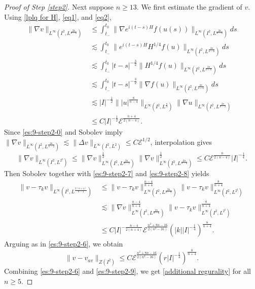 \documentclass[11pt,a4paper]{article}
\numberwithin{equation}{section}
\begin{document}
\begin{proof}[Proof of Step \ref{step2}]
Next suppose $n \geq 13$. We first estimate the gradient of $v$.
Using \eqref{lplq for H}, \eqref{eq1}, and \eqref{eq2},
\begin{equation}\label{es:9-step2-7}
\begin{aligned}
\|\nabla v\|_{L^{\infty}(I^{2}, L^{\frac{2n}{n-6}})}
&\leq \int_{t_{-}}^{t_{0}}\|\nabla e^{i(t-s)H}f(u(s))\|_{L^{\infty}(I^{2}, L^{\frac{2n}{n-6}})} ds \\
&\lesssim \int_{t_{-}}^{t_{0}}\|e^{i(t-s)H}H^{1/4}f(u)\|_{L^{\infty}(I^{2}, L^{\frac{2n}{n-6}})} ds \\
&\lesssim \int_{t_{-}}^{t_{0}}|t-s|^{-\frac{3}{2}} \|H^{1/4}f(u)\|_{L^{\infty}(I^{2}, L^{\frac{2n}{n+6}})} ds \\
&\lesssim \int_{t_{-}}^{t_{0}}|t-s|^{-\frac{3}{2}} \|\nabla f(u)\|_{L^{\infty}(I^{2}, L^{\frac{2n}{n+6}})} ds \\
&\lesssim |I|^{-\frac{1}{2}}\||u|^{\frac{8}{n-4}}\|_{L^{\infty}(I^{2}, L^{\frac{n}{4}})}\|\nabla u \|_{L^{\infty}(I^{2}, L^{\frac{2n}{n-2}})} \\
&\leq C|I|^{-\frac{1}{2}}\mathcal{E}^{\frac{n+4}{2(n-4)}}.
\end{aligned}
\end{equation}
Since \eqref{es:9-step2-0} and Sobolev imply $\|\nabla v\|_{L^{\infty}(I^{2}, L^{\frac{2n}{n-2}})} \lesssim \|\Delta v \|_{L^{\infty}(I^{2}, L^{2})} \leq C\mathcal{E}^{1/2}$, interpolation gives
\begin{equation}\label{es:9-step2-8}
\|\nabla v\|_{L^{\infty}(I^{2}, L^{2^{\sharp}})} \leq \|\nabla v\|_{L^{\infty}(I^{2}, L^{\frac{2n}{n-2}})}^{\frac{1}{2}}\|\nabla v\|_{L^{\infty}(I^{2}, L^{\frac{2n}{n-6}})}^{\frac{1}{2}}
\leq C\mathcal{E}^{\frac{n}{2(n-4)}}|I|^{-\frac{1}{4}}.
\end{equation}
Then Sobolev together with \eqref{es:9-step2-7} and \eqref{es:9-step2-8} yields
\begin{align*}
\|v - \tau_{k}v\|_{L^{\infty}(I^{2}, L^{\frac{2(n+4)}{n-4}})}
&\leq \|v - \tau_{k}v\|_{L^{\infty}(I^{2}, L^{\frac{2n}{n-8}})}^{\frac{n-4}{n+4}} \|v - \tau_{k}v\|_{L^{\infty}(I^{2}, L^{2^{\sharp}})}^{\frac{8}{n+4}} \\
&\lesssim \|\nabla v\|_{L^{\infty}(I^{2}, L^{\frac{2n}{n-6}})}^{\frac{n-4}{n+4}} \|v - \tau_{k}v\|_{L^{\infty}(I^{2}, L^{2^{\sharp}})}^{\frac{8}{n+4}} \\
&\leq C|I|^{-\frac{n-4}{2(n+4)}}\mathcal{E}^{\frac{n^{2} + 8n -16}{2(n^{2}-16)}}\left( |k||I|^{-\frac{1}{4}} \right)^{\frac{8}{n+4}}.
\end{align*}
Arguing as in \eqref{es:9-step2-6}, we obtain
\begin{equation}\label{es:9-step2-9}
\|v - v_{av}\|_{Z(I^{2})} \leq C\mathcal{E}^{\frac{n^{2} + 8n -16}{2(n^{2}-16)}}\left( r|I|^{-\frac{1}{4}} \right)^{\frac{8}{n+4}}.
\end{equation}
Combining \eqref{es:9-step2-6} and \eqref{es:9-step2-9}, we get \eqref{additional regurality} for all $n \geq 5$.


\end{proof}
\end{document}
